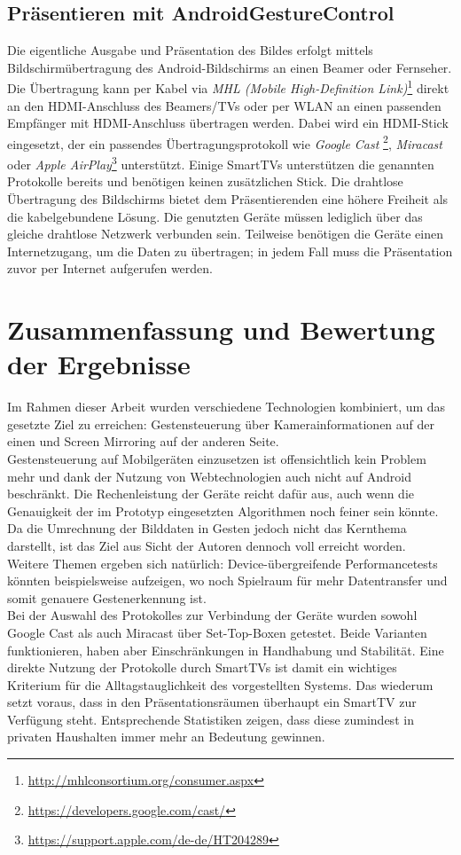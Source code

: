 \documentclass{article}
\begin{document}
\subsection{Präsentieren mit AndroidGestureControl}
\label{ref:present}
Die eigentliche Ausgabe und Präsentation des Bildes erfolgt mittels Bildschirmübertragung des Android-Bildschirms an einen Beamer oder Fernseher. Die Übertragung kann per Kabel via \textit{MHL (Mobile High-Definition Link)}\footnote{\url{http://mhlconsortium.org/consumer.aspx}} direkt an den HDMI-Anschluss des Beamers/TVs oder per WLAN an einen passenden Empfänger mit HDMI-Anschluss übertragen werden. Dabei wird ein HDMI-Stick eingesetzt, der ein passendes Übertragungsprotokoll wie \textit{Google Cast} \footnote{\url{https://developers.google.com/cast/}}, \textit{Miracast} \cite{ijitr555} oder \textit{Apple AirPlay}\footnote{\url{https://support.apple.com/de-de/HT204289}} unterstützt. Einige SmartTVs unterstützen die genannten Protokolle bereits und benötigen keinen zusätzlichen Stick. Die drahtlose Übertragung des Bildschirms bietet dem Präsentierenden eine höhere Freiheit als die kabelgebundene Lösung. Die genutzten Geräte müssen lediglich über das gleiche drahtlose Netzwerk verbunden sein. Teilweise benötigen die Geräte einen Internetzugang, um die Daten zu übertragen; in jedem Fall muss die Präsentation zuvor per Internet aufgerufen werden.

\section{Zusammenfassung und Bewertung der Ergebnisse}
Im Rahmen dieser Arbeit wurden verschiedene Technologien kombiniert, um das gesetzte Ziel zu erreichen: Gestensteuerung über Kamerainformationen auf der einen und Screen Mirroring auf der anderen Seite.\\
Gestensteuerung auf Mobilgeräten einzusetzen ist offensichtlich kein Problem mehr und dank der Nutzung von Webtechnologien auch nicht auf Android beschränkt. Die Rechenleistung der Geräte reicht dafür aus, auch wenn die Genauigkeit der im Prototyp eingesetzten Algorithmen noch feiner sein könnte. Da die Umrechnung der Bilddaten in Gesten jedoch nicht das Kernthema darstellt, ist das Ziel aus Sicht der Autoren dennoch voll erreicht worden.\\ Weitere Themen ergeben sich natürlich: Device-übergreifende Performancetests könnten beispielsweise aufzeigen, wo noch Spielraum für mehr Datentransfer und somit genauere Gestenerkennung ist.\\
Bei der Auswahl des Protokolles zur Verbindung der Geräte wurden sowohl Google Cast als auch Miracast über Set-Top-Boxen getestet. Beide Varianten funktionieren, haben aber Einschränkungen in Handhabung und Stabilität. Eine direkte Nutzung der Protokolle durch SmartTVs ist damit ein wichtiges Kriterium für die Alltagstauglichkeit des vorgestellten Systems. Das wiederum setzt voraus, dass in den Präsentationsräumen überhaupt ein SmartTV zur Verfügung steht. Entsprechende Statistiken \cite{statistatv} zeigen, dass diese zumindest in privaten Haushalten immer mehr an Bedeutung gewinnen.
\newpage
\end{document}

